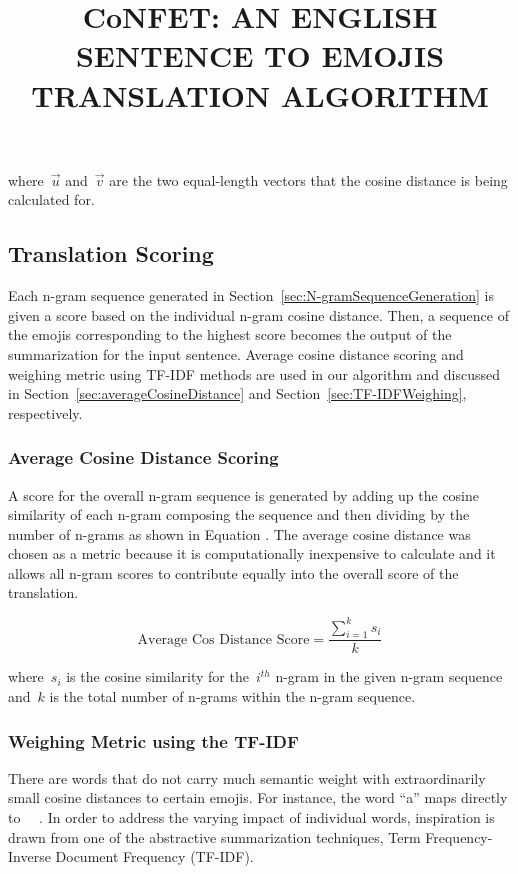\documentclass{article}[10]
\newcommand*{\img}[1]{%
  \raisebox{-.3\baselineskip}{%
    \texttt{[image: \#1]}%
  }%
} \title{{CoNFET:} AN ENGLISH SENTENCE TO EMOJIS TRANSLATION ALGORITHM}
\begin{document}
where~\(\vec{u}\) and~\(\vec{v}\) are the two equal-length vectors that the cosine distance is being
calculated for.

\subsection{Translation Scoring\label{sec:translationScoring}}

Each n-gram sequence generated in Section~\ref{sec:N-gramSequenceGeneration} is
given a score based on the individual n-gram cosine distance. Then, a sequence
of the emojis corresponding to the highest score becomes the output of the
summarization for the input sentence. Average cosine distance scoring and
weighing metric using TF-IDF methods are used in our algorithm and discussed in
Section~\ref{sec:averageCosineDistance} and Section~\ref{sec:TF-IDFWeighing},
respectively.

\subsubsection{Average Cosine Distance
  Scoring\label{sec:averageCosineDistance}}

A score for the overall n-gram sequence is generated by adding up the cosine
similarity of each n-gram composing the sequence and then dividing by the number
of n-grams as shown in Equation . The average
cosine distance was chosen as a metric because it is computationally
inexpensive to calculate and it allows all n-gram scores to contribute equally
into the overall score of the translation.

\begin{equation}
  \textrm{Average Cos Distance Score} = \frac{\sum_{i=1}^{k}s_{i}}{k} \label{eq:averageCosineDistance}
\end{equation}

where~\(s_{i}\) is the cosine similarity for the~\(i^{th}\) n-gram in the given
n-gram sequence and~\(k\) is the total number of n-grams within the n-gram
sequence.

\subsubsection{Weighing Metric using the TF-IDF\label{sec:TF-IDFWeighing}}

There are words that do not carry much semantic weight with extraordinarily
small cosine distances to certain emojis. For instance, the word ``a'' maps
directly to~~\img{emojis/1f4af.png}. In order to address the varying impact of
individual words, inspiration is drawn from one of the abstractive summarization
techniques, Term Frequency-Inverse Document Frequency (TF-IDF).
\end{document}

